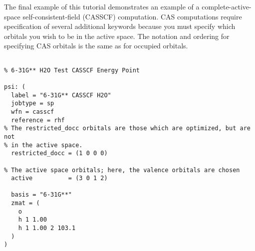 The final example of this tutorial demonstrates an example of a
complete-active-space self-consistent-field (CASSCF)
computation.  CAS computations require specification of several additional
keywords because you must specify which orbitals you wish to be in the
active space.  The notation and ordering for specifying CAS orbitals is the
same as for occupied orbitals.

\begin{verbatim}

% 6-31G** H2O Test CASSCF Energy Point

psi: (
  label = "6-31G** CASSCF H2O"
  jobtype = sp
  wfn = casscf
  reference = rhf
% The restricted_docc orbitals are those which are optimized, but are not
% in the active space.
  restricted_docc = (1 0 0 0)

% The active space orbitals; here, the valence orbitals are chosen
  active          = (3 0 1 2)

  basis = "6-31G**"
  zmat = (
    o
    h 1 1.00
    h 1 1.00 2 103.1
  )
)
\end{verbatim}

